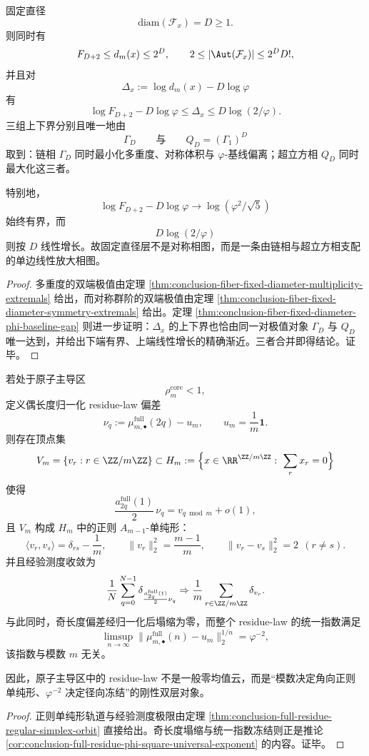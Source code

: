 \begin{theorem}[固定直径层中链相与超立方相构成乘法型审计不变量的共同双端相]\label{thm:conclusion-fixed-diameter-chain-cube-common-dual-phase}
固定直径
\[
\mathrm{diam}(\mathcal F_x)=D\ge 1.
\]
则同时有
\[
F_{D+2}\le d_m(x)\le 2^D,
\qquad
2\le |\Aut(\mathcal F_x)|\le 2^D D!,
\]
并且对
\[
\Delta_x:=\log d_m(x)-D\log\varphi
\]
有
\[
\log F_{D+2}-D\log\varphi
\le
\Delta_x
\le
D\log(2/\varphi).
\]
三组上下界分别且唯一地由
\[
\Gamma_D
\qquad\text{与}\qquad
Q_D=(\Gamma_1)^D
\]
取到：链相 \(\Gamma_D\) 同时最小化多重度、对称体积与 \(\varphi\)-基线偏离；超立方相 \(Q_D\) 同时最大化这三者。

特别地，
\[
\log F_{D+2}-D\log\varphi \to \log(\varphi^2/\sqrt5)
\]
始终有界，而
\[
D\log(2/\varphi)
\]
则按 \(D\) 线性增长。故固定直径层不是对称相图，而是一条由链相与超立方相支配的单边线性放大相图。
\end{theorem}
\begin{proof}
多重度的双端极值由定理 \ref{thm:conclusion-fiber-fixed-diameter-multiplicity-extremals} 给出，而对称群阶的双端极值由定理 \ref{thm:conclusion-fiber-fixed-diameter-symmetry-extremals} 给出。定理 \ref{thm:conclusion-fiber-fixed-diameter-phi-baseline-gap} 则进一步证明：\(\Delta_x\) 的上下界也恰由同一对极值对象 \(\Gamma_D\) 与 \(Q_D\) 唯一达到，并给出下端有界、上端线性增长的精确渐近。三者合并即得结论。证毕。
\end{proof}

\begin{theorem}\label{thm:conclusion-atomic-residue-simplex-radial-freeze-splitting}
若处于原子主导区
\[
\rho_m^{\mathrm{core}}<1,
\]
定义偶长度归一化 residue-law 偏差
\[
\nu_q:=\mu_{m,\bullet}^{\mathrm{full}}(2q)-u_m,
\qquad
u_m=\frac1m\mathbf 1.
\]
则存在顶点集
\[
V_m=\{v_r:r\in\ZZ/m\ZZ\}\subset
H_m:=
\Bigl\{x\in\RR^{\ZZ/m\ZZ}:\ \sum_r x_r=0\Bigr\}
\]
使得
\[
\frac{a_{2q}^{\mathrm{full}}(1)}{2}\,\nu_q
=
v_{q\bmod m}+o(1),
\]
且 \(V_m\) 构成 \(H_m\) 中的正则 \(A_{m-1}\)-单纯形：
\[
\langle v_r,v_s\rangle=\delta_{rs}-\frac1m,
\qquad
\|v_r\|_2^2=\frac{m-1}{m},
\qquad
\|v_r-v_s\|_2^2=2\ \ (r\neq s).
\]
并且经验测度收敛为
\[
\frac1N\sum_{q=0}^{N-1}\delta_{\frac{a_{2q}^{\mathrm{full}}(1)}{2}\nu_q}
\Rightarrow
\frac1m\sum_{r\in\ZZ/m\ZZ}\delta_{v_r}.
\]
与此同时，奇长度偏差经归一化后塌缩为零，而整个 residue-law 的统一指数满足
\[
\limsup_{n\to\infty}
\|\mu_{m,\bullet}^{\mathrm{full}}(n)-u_m\|_2^{1/n}
=
\varphi^{-2},
\]
该指数与模数 \(m\) 无关。

因此，原子主导区中的 residue-law 不是一般零均值云，而是“模数决定角向正则单纯形、\(\varphi^{-2}\) 决定径向冻结”的刚性双层对象。
\end{theorem}
\begin{proof}
正则单纯形轨道与经验测度极限由定理 \ref{thm:conclusion-full-residue-regular-simplex-orbit} 直接给出。奇长度塌缩与统一指数冻结则正是推论 \ref{cor:conclusion-full-residue-phi-square-universal-exponent} 的内容。证毕。
\end{proof}

